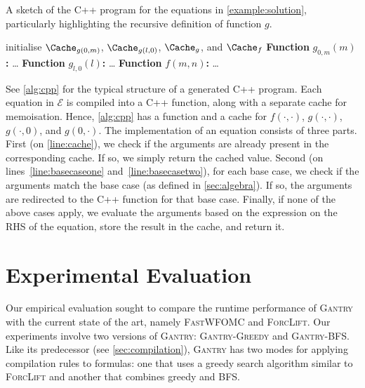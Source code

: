 \documentclass[a4paper,UKenglish,cleveref, autoref, thm-restate]{lipics-v2021}
\newcommand{\Cranetwo}{\textsc{Gantry}}
\newcommand{\Cranebfs}{\textsc{Gantry-BFS}}
\newcommand{\Cranegreedy}{\textsc{Gantry-Greedy}}
\begin{document}
\begin{algorithm}[t]
  \caption{A sketch of the C++ program for the equations in \cref{example:solution}, particularly highlighting the recursive definition of function $g$.}\label{alg:cpp}
  initialise $\Cache_{g(0, m)}$, $\Cache_{g(l, 0)}$, $\Cache_{g}$, and
  $\Cache_{f}$\; \DontPrintSemicolon \textbf{Function} $g_{0,m}(m)$\textbf{:}
  \dots\; \textbf{Function} $g_{l,0}(l)$\textbf{:} \dots\; \PrintSemicolon
   \DontPrintSemicolon \textbf{Function} $f(m, n)$\textbf{:}
  \dots\; \PrintSemicolon {}
\end{algorithm}

See \cref{alg:cpp} for the typical structure of a generated C++ program. Each
equation in $\mathcal{E}$ is compiled into a C++ function, along with a separate
cache for memoisation. Hence, \cref{alg:cpp} has a function and a cache for
$f(\cdot, \cdot)$, $g(\cdot, \cdot)$, $g(\cdot, 0)$, and $g(0, \cdot)$. The
implementation of an equation consists of three parts. First (on
\autoref{line:cache}), we check if the arguments are already present in the
corresponding cache. If so, we simply return the cached value. Second (on
lines~\ref{line:basecaseone} and~\ref{line:basecasetwo}), for each base case, we
check if the arguments match the base case (as defined in \cref{sec:algebra}).
If so, the arguments are redirected to the C++ function for that base case.
Finally, if none of the above cases apply, we evaluate the arguments based on
the expression on the RHS of the equation, store the result in the cache, and
return it.

\section{Experimental Evaluation}\label{sec:experiments}

Our empirical evaluation sought to compare the runtime performance of
{\Cranetwo} with the current state of the art, namely \textsc{FastWFOMC} and
\textsc{ForcLift}. Our experiments involve two versions of \Cranetwo{}:
\Cranegreedy{} and \Cranebfs{}. Like its predecessor (see
\cref{sec:compilation}), \Cranetwo{} has two modes for applying compilation
rules to formulas: one that uses a greedy search algorithm similar to
\textsc{ForcLift} and another that combines greedy and BFS\@.
\end{document}
